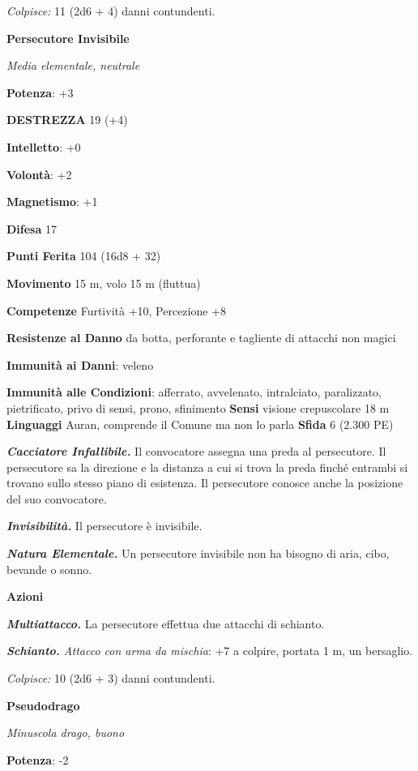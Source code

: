 \begin{multicols}{2}
\emph{Colpisce:} 11 (2d6 + 4) danni contundenti.

\textbf{Persecutore Invisibile}

\emph{Media elementale, neutrale}

\textbf{Potenza}: +3

\textbf{DESTREZZA} 19 (+4)



\textbf{Intelletto}: +0

\textbf{Volontà}: +2

\textbf{Magnetismo}: +1

\textbf{Difesa} 17

\textbf{Punti Ferita} 104 (16d8 + 32)

\textbf{Movimento} 15 m, volo 15 m (fluttua)

\textbf{Competenze} Furtività +10, Percezione +8

\textbf{Resistenze al Danno} da botta, perforante e tagliente di
attacchi non magici

\textbf{Immunità ai Danni}: veleno

\textbf{Immunità alle Condizioni}: afferrato, avvelenato, intralciato,
paralizzato, pietrificato, privo di sensi, prono, sfinimento
\textbf{Sensi} visione crepuscolare 18 m
\textbf{Linguaggi} Auran, comprende il Comune ma non lo parla
\textbf{Sfida} 6 (2.300 PE)\smallskip

\emph{\textbf{Cacciatore Infallibile.}} Il convocatore assegna una preda
al persecutore. Il persecutore sa la direzione e la distanza a cui si
trova la preda finché entrambi si trovano sullo stesso piano di
esistenza. Il persecutore conosce anche la posizione del suo
convocatore.

\emph{\textbf{Invisibilità.}} Il persecutore è invisibile.

\emph{\textbf{Natura Elementale.}} Un persecutore invisibile non ha
bisogno di aria, cibo, bevande o sonno.

\smallskip\textbf{Azioni}

\emph{\textbf{Multiattacco.}} La persecutore effettua due attacchi di
schianto.

\emph{\textbf{Schianto.} Attacco con arma da mischia}: +7 a colpire,
portata 1 m, un bersaglio.

\emph{Colpisce:} 10 (2d6 + 3) danni contundenti.

\textbf{Pseudodrago}

\emph{Minuscola drago, buono}

\textbf{Potenza}: -2


\end{multicols}
